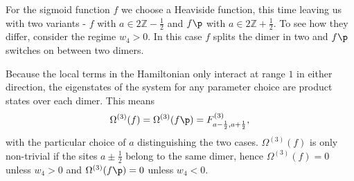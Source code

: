 For the sigmoid function $f$ we choose a Heaviside function, this time leaving us with two variants - $f$ with $a\in 2\mathbb{Z} - \frac{1}{2}$ and $f\p$ with $a\in 2\mathbb{Z} + \frac{1}{2}$. To see how they differ, consider the regime $w_{4} > 0$. In this case $f$ splits the dimer in two and $f\p$ switches on between two dimers.

Because the local terms in the Hamiltonian only interact at range $1$ in either direction, the eigenstates of the system for any parameter choice are product states over each dimer. This means
\begin{align*}
	\Omega^{(3)}(f) = \Omega^{(3)}(f\p) = F^{(3)}_{a - \frac{1}{2}, a + \frac{1}{2}},
\end{align*}
with the particular choice of $a$ distinguishing the two cases. $\Omega^{(3)}(f)$ is only non-trivial if the sites $a \pm \frac{1}{2}$ belong to the same dimer, hence $\Omega^{(3)}(f) = 0$ unless $w_{4} > 0$ and $\Omega^{(3)}(f\p) = 0$ unless $w_{4} < 0$.

